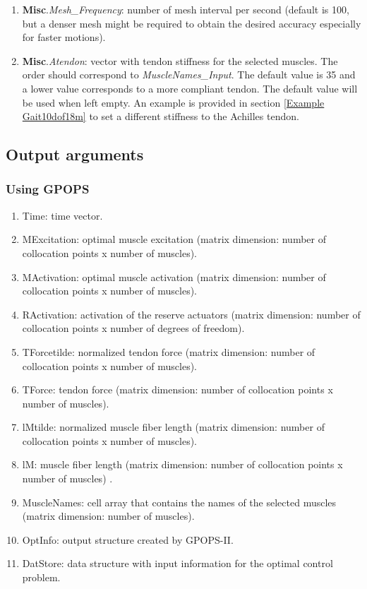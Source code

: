 \documentclass[a4paper,oneside,11pt]{article}
\begin{document}
\begin{enumerate}
	\item \textbf{Misc}.\textit{Mesh_Frequency}: number of mesh interval per second (default is 100, but a denser mesh might be required to obtain the desired accuracy especially for faster motions).
	
	\item \textbf{Misc}.\textit{Atendon}: vector with tendon stiffness for the selected muscles. The order should correspond to \textit{MuscleNames_Input}. The default value is 35 and a lower value corresponds to a more compliant tendon. The default value will be used when left empty. An example is provided in section \ref{Example Gait10dof18m} to set a different stiffness to the Achilles tendon.

\end{enumerate}

\subsection{Output arguments}

\subsubsection{Using GPOPS}
\begin{enumerate}
	\item Time: time vector.
	\item MExcitation: optimal muscle excitation (matrix dimension: number of collocation points x number of muscles).
	\item MActivation: optimal muscle activation (matrix dimension: number of collocation points x number of muscles).
	\item RActivation: activation of the reserve actuators (matrix dimension: number of collocation points x number of degrees of freedom).
	\item TForcetilde: normalized tendon force (matrix dimension: number of collocation points x number of muscles).
	\item TForce: tendon force (matrix dimension: number of collocation points x number of muscles).
	\item lMtilde: normalized muscle fiber length (matrix dimension: number of collocation points x number of muscles).
	\item lM:  muscle fiber length (matrix dimension: number of collocation points x number of muscles)	.
	\item MuscleNames: cell array that contains the names of the selected muscles (matrix dimension: number of muscles).
	\item OptInfo: output structure created by GPOPS-II.
	\item DatStore: data structure with input information for the optimal control problem.
\end{enumerate}
\end{document}
